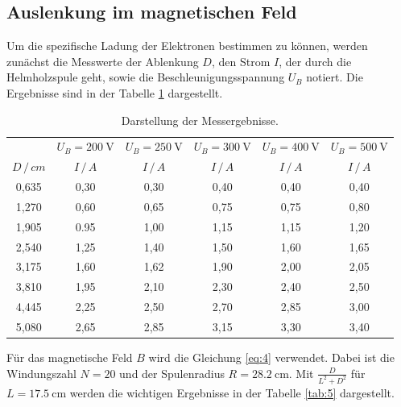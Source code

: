 \subsection{Auslenkung im magnetischen Feld}
Um die spezifische Ladung der Elektronen bestimmen zu können, werden zunächst
die Messwerte der Ablenkung $D$, den Strom $I$, der durch die Helmholzspule geht, sowie die
Beschleunigungsspannung $U_B$ notiert.
Die Ergebnisse sind in der Tabelle \ref{tab:4} dargestellt.
\begin{table}[H]
  \centering
  \caption{Darstellung der Messergebnisse.}
  \label{tab:4}
  \begin{tabular}{c c c c c c}
\toprule
& \multicolumn{1}{c}{$U_B=\SI{200}{\volt}$} & \multicolumn{1}{c}{$U_B=\SI{250}{\volt}$} &\multicolumn{1}{c}{$U_B=\SI{300}{\volt}$}&\multicolumn{1}{c}{$U_B=\SI{400}{\volt}$}&\multicolumn{1}{c}{$U_B=\SI{500}{\volt}$}\\
\cmidrule(lr){2-2}\cmidrule(lr){3-3}\cmidrule(lr){4-4}\cmidrule(lr){5-5}\cmidrule(lr){6-6}
$D \, / \, cm$ & $I \, / \, A$ & $I \, / \, A$ & $I \, / \, A$ &$I \, / \, A$ & $I \, / \, A$\\
\midrule
0,635 & 0,30  & 0,30 & 0,40 & 0,40& 0,40\\
1,270 & 0,60  & 0,65 & 0,75 & 0,75& 0,80\\
1,905 & 0.95  & 1,00 & 1,15 & 1,15& 1,20\\
2,540 & 1,25  & 1,40 & 1,50 & 1,60& 1,65\\
3,175 & 1,60  & 1,62 & 1,90 & 2,00& 2,05\\
3,810 & 1,95  & 2,10 & 2,30 & 2,40& 2,50\\
4,445 & 2,25  & 2,50 & 2,70 & 2,85& 3,00\\
5,080 & 2,65  & 2,85 & 3,15 & 3,30& 3,40\\
\bottomrule
  \end{tabular}
\end{table}
Für das magnetische Feld $B$ wird die Gleichung \ref{eq:4} verwendet. Dabei ist die
Windungszahl $N = 20 $ und der Spulenradius $R = \SI{28.2}{\centi\meter}$.
Mit $\frac{D}{L^2+D^2}$ für $L = \SI{17.5}{\centi\meter}$ werden die wichtigen
Ergebnisse in der Tabelle \ref{tab:5} dargestellt.
